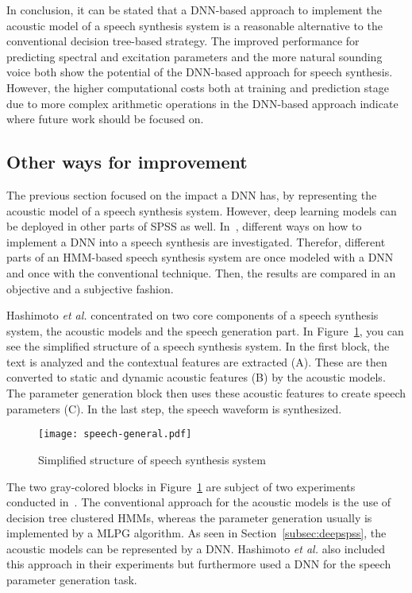 In conclusion, it can be stated that a \ac{DNN}-based approach to implement the acoustic model
of a speech synthesis system is a reasonable alternative to the conventional decision tree-based strategy. The improved performance for predicting spectral and excitation parameters and the more natural sounding voice both show the potential of the \ac{DNN}-based approach for speech synthesis. However, the higher computational costs both at training and prediction stage due to more complex arithmetic operations in the \ac{DNN}-based approach indicate where future work should be focused on.

\subsection{Other ways for improvement}
\label{subsec:deepeffect}

The previous section focused on the impact a \ac{DNN} has, by representing the acoustic model of a speech synthesis system. However, deep learning models can be deployed in other parts of \ac{SPSS} as well. In~\cite{hashimoto:effect}, different ways on how to implement a \ac{DNN} into a speech synthesis are investigated. Therefor, different parts of an \ac{HMM}-based speech synthesis system are once modeled with a \ac{DNN} and once with the conventional technique. Then, the results are compared in an objective and a subjective fashion.

Hashimoto \textit{et al.} concentrated on two core components of a speech synthesis system, the acoustic models and the speech generation part. In Figure~\ref{fig:generalspeech}, you can see the simplified structure of a speech synthesis system. In the first block, the text is analyzed and the contextual features are extracted (A). These are then converted to static and dynamic acoustic features (B) by the acoustic models. The parameter generation block then uses these acoustic features to create speech parameters (C). In the last step, the speech waveform is synthesized.

\begin{figure}[h]
	\texttt{[image: speech-general.pdf]}
	\caption{Simplified structure of speech synthesis system~\cite{hashimoto:effect}}
	\label{fig:generalspeech}
\end{figure}

The two gray-colored blocks in Figure~\ref{fig:generalspeech} are subject of two experiments conducted in~\cite{hashimoto:effect}. The conventional approach for the acoustic models is the use of decision tree clustered \acp{HMM}, whereas the parameter generation usually is implemented by a \ac{MLPG} algorithm. As seen in Section~\ref{subsec:deepspss}, the acoustic models can be represented by a \ac{DNN}. Hashimoto \textit{et al.} also included this approach in their experiments but furthermore used a \ac{DNN} for the speech parameter generation task.

